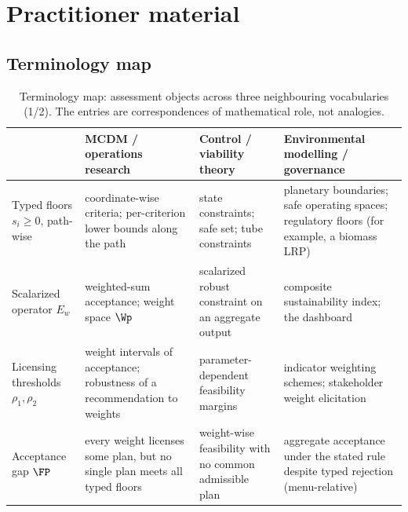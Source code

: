 \section{Practitioner material}\label{si:practice}

\subsection{Terminology map}

\begin{table}[!htbp]
\centering\small
\caption{Terminology map: assessment objects across three neighbouring vocabularies (1/2). The entries are correspondences of mathematical role, not analogies.}
\label{tab:translation}
\begin{tabularx}{\textwidth}{@{}>{\raggedright\arraybackslash}p{}>{\raggedright\arraybackslash}X>{\raggedright\arraybackslash}X>{\raggedright\arraybackslash}X@{}}
\toprule
 & MCDM / operations research & Control / viability theory & Environmental modelling / governance \\
\midrule
Typed floors $s_i\ge0$, path-wise & coordinate-wise criteria; per-criterion lower bounds along the path & state constraints; safe set; tube constraints & planetary boundaries; safe operating spaces; regulatory floors (for example, a biomass LRP) \\
\addlinespace
Scalarized operator $E_w$ & weighted-sum acceptance; weight space $\Wp$ & scalarized robust constraint on an aggregate output & composite sustainability index; the dashboard \\
\addlinespace
Licensing thresholds $\rho_1,\rho_2$ & weight intervals of acceptance; robustness of a recommendation to weights & parameter-dependent feasibility margins & indicator weighting schemes; stakeholder weight elicitation \\
\addlinespace
Acceptance gap $\FP$ & every weight licenses some plan, but no single plan meets all typed floors & weight-wise feasibility with no common admissible plan & aggregate acceptance under the stated rule despite typed rejection (menu-relative) \\
\bottomrule
\end{tabularx}
\end{table}

